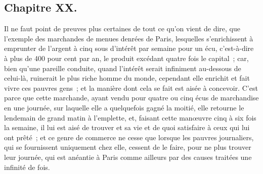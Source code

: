 \documentclass[french,twoside]{book} %
\begin{document}
\subsection[{Chapitre XX.}]{Chapitre XX.}
\noindent Il ne faut point de preuves plus certaines de tout ce qu’on vient de dire, que l’exemple des marchandes de menues denrées de Paris, lesquelles s’enrichissent à emprunter de l’argent à cinq sous d’intérêt par semaine pour un écu, c’est-à-dire à plus de 400 pour cent par an, le produit excédant quatre fois le capital ; car, bien qu’une pareille conduite, quand l’intérêt serait infiniment au-dessous de celui-là, ruinerait le plus riche homme du monde, cependant elle enrichit et fait vivre ces pauvres gens ; et la manière dont cela se fait est aisée à concevoir. C’est parce que cette marchande, ayant vendu pour quatre ou cinq écus de marchandise en une journée, sur laquelle elle a quelquefois gagné la moitié, elle retourne le lendemain de grand matin à l’emplette, et, faisant cette manœuvre cinq à six fois la semaine, il lui est aisé de trouver et sa vie et de quoi satisfaire à ceux qui lui ont prêté ; et ce genre de commerce ne cesse que lorsque les pauvres journaliers, qui se fournissent uniquement chez elle, cessent de le faire, pour ne plus trouver leur journée, qui est anéantie à Paris comme ailleurs par des causes traitées une infinité de fois.
\end{document}
